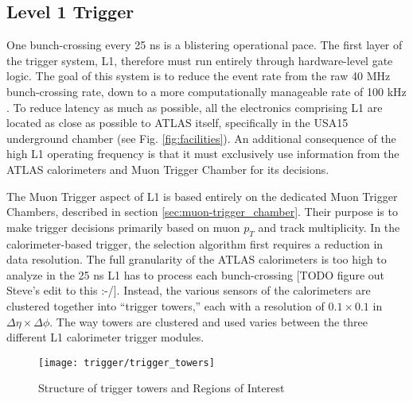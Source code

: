     \subsection{Level 1 Trigger}\label{sec:L1}

        One bunch-crossing every 25 ns is a blistering operational pace.
        The first layer of the trigger system, L1, therefore must run entirely through hardware-level gate logic.
        The goal of this system is to reduce the event rate from the raw 40 MHz bunch-crossing rate,
            down to a more computationally manageable rate of 100 kHz \cite{trigger_run2}.
        To reduce latency as much as possible, all the electronics comprising L1 are located as close as possible to ATLAS itself, specifically in the USA15 underground chamber \cite{trigger_tdr} (see Fig. \ref{fig:facilities}).
        An additional consequence of the high L1 operating frequency
            is that it must exclusively use information from the ATLAS calorimeters and Muon Trigger Chamber for its decisions.

        The Muon Trigger aspect of L1 is based entirely on the dedicated Muon Trigger Chambers, described in section \ref{sec:muon-trigger_chamber}.
        Their purpose is to make trigger decisions primarily based on muon $p_T$ and track multiplicity\cite{trigger_run1}.
        In the calorimeter-based trigger, the selection algorithm first requires a reduction in data resolution.
        The full granularity of the ATLAS calorimeters is too high to analyze in the 25 ns L1 has to process each bunch-crossing
            [TODO figure out Steve's edit to this :-/].
        Instead, the various sensors of the calorimeters are clustered together into ``trigger towers,''
            each with a resolution of $0.1 \times 0.1$ in $\Delta \eta \times \Delta \phi$.
        The way towers are clustered and used varies between the three different L1 calorimeter trigger modules.

        \begin{figure}[h]
            \texttt{[image: trigger/trigger\_towers]}
            \caption{Structure of trigger towers and Regions of Interest \cite{L1_calo_run1}}
            \label{fig:trigger_towers}
        \end{figure}


